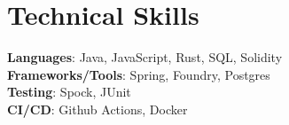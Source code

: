 \documentclass[letterpaper,11pt]{article}
\makeatletter
\newcommand{\resumeItem}[1]{
    \item\small{
            {#1 \vspace{-2pt}}
    }
}
\newcommand{\resumeProjectHeading}[2]{
    \item
    \begin{tabular*}{0.97\textwidth}{l@{\extracolsep{\fill}}r}
    \small#1 & #2 \\
    \end{tabular*}\vspace{-7pt}
}
\newcommand{\resumeSubHeadingListStart}{\begin{itemize}[leftmargin=0.15in, label={}]}
\newcommand{\resumeSubHeadingListEnd}{\end{itemize}}
\newcommand{\resumeItemListStart}{\begin{itemize}}
\newcommand{\resumeItemListEnd}{\end{itemize}\vspace{-5pt}}
\makeatother
\begin{document}

%
\section{Technical Skills}
\begin{itemize}[leftmargin=0.15in, label={}]
\small{\item{
\textbf{Languages}{: Java, JavaScript, Rust, SQL, Solidity} \\
\textbf{Frameworks/Tools}{: Spring, Foundry, Postgres} \\
\textbf{Testing}{: Spock, JUnit} \\
\textbf{CI/CD}{: Github Actions, Docker} \\
}}
\end{itemize}


\end{document}
